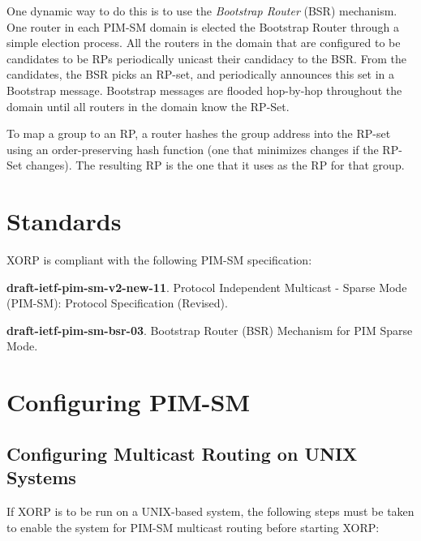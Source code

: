 One dynamic way to do this is to use the {\it Bootstrap Router} (BSR)
mechanism. 
One router in each PIM-SM domain is elected the Bootstrap Router through
a simple election process.  All the routers in the domain that are
configured to be candidates to be RPs periodically unicast their
candidacy to the BSR.  From the candidates, the BSR picks an RP-set,
and periodically announces this set in a Bootstrap message.  Bootstrap
messages are flooded hop-by-hop throughout the domain until all
routers in the domain know the RP-Set.

To map a group to an RP, a router hashes the group address into the
RP-set using an order-preserving hash function (one that minimizes
changes if the RP-Set changes).  The resulting RP is the one that it
uses as the RP for that group.

\section{Standards}

XORP is compliant with the following PIM-SM specification:
\begin{description}
\item{\bf draft-ietf-pim-sm-v2-new-11}.  Protocol Independent
  Multicast - Sparse Mode (PIM-SM): Protocol Specification (Revised).
\item{\bf draft-ietf-pim-sm-bsr-03}.  Bootstrap Router (BSR) Mechanism
  for PIM Sparse Mode.
\end{description}

\section{Configuring PIM-SM}

\subsection{Configuring Multicast Routing on UNIX Systems}

If XORP is to be run on a UNIX-based system, the following steps
must be taken to enable the system for PIM-SM multicast routing
before starting XORP:

